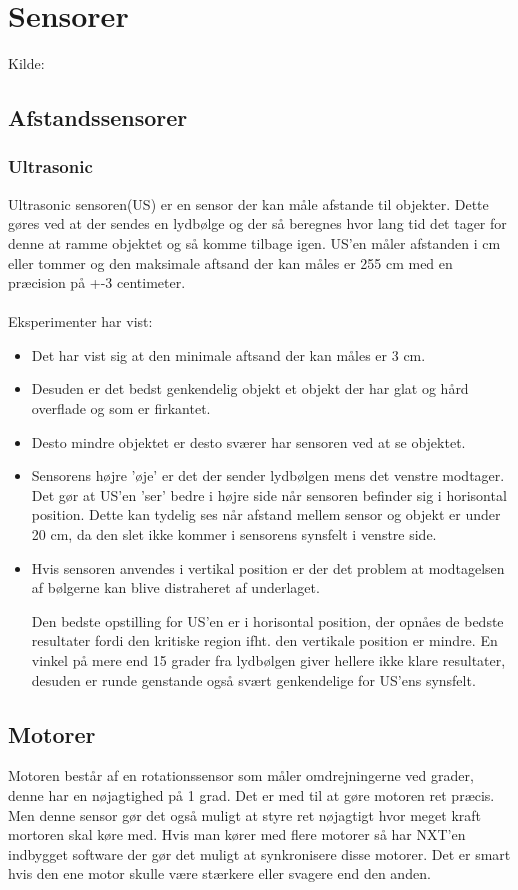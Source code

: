 \documentclass[a4paper,12pt]{report}
\begin{document}
\section{Sensorer}
Kilde: \cite{tikNXT}
\subsection{Afstandssensorer}
\subsubsection{Ultrasonic}
Ultrasonic sensoren(US) er en sensor der kan måle afstande til objekter. Dette gøres ved at der sendes en lydbølge og der så beregnes hvor lang tid det tager for denne at ramme objektet og så komme tilbage igen.
US'en måler afstanden i cm eller tommer og den maksimale aftsand der kan måles er 255 cm med en præcision på +-3 centimeter.
\\
\\
Eksperimenter\cite{keylist} har vist:
\begin{itemize}
\item Det har vist sig at den minimale aftsand der kan måles er 3 cm.
\item Desuden er det bedst genkendelig objekt et objekt der har glat og hård overflade og som er firkantet.
\item Desto mindre objektet er desto sværer har sensoren ved at se objektet.
\item Sensorens højre 'øje' er det der sender lydbølgen mens det venstre modtager.
Det gør at US'en 'ser' bedre i højre side når sensoren befinder sig i horisontal position.
Dette kan tydelig ses når afstand mellem sensor og objekt er under 20 cm, da den slet ikke kommer i sensorens synsfelt i venstre side.
\item Hvis sensoren anvendes i vertikal position er der det problem at modtagelsen af bølgerne kan blive distraheret af underlaget.

Den bedste opstilling for US'en er i horisontal position, der opnåes de bedste resultater fordi den kritiske region ifht. den vertikale position er mindre.
En vinkel på mere end 15 grader fra lydbølgen giver hellere ikke klare resultater, desuden er runde genstande også svært genkendelige for US'ens synsfelt.
\end{itemize}

\subsection{Motorer}
Motoren består af en rotationssensor som måler omdrejningerne ved grader, denne har en nøjagtighed på 1 grad. Det er med til at gøre motoren ret præcis. Men denne sensor gør det også muligt at styre ret nøjagtigt hvor meget kraft mortoren skal køre med.
Hvis man kører med flere motorer så har NXT'en indbygget software der gør det muligt at synkronisere disse motorer.
Det er smart hvis den ene motor skulle være stærkere eller svagere end den anden.
\end{document}
